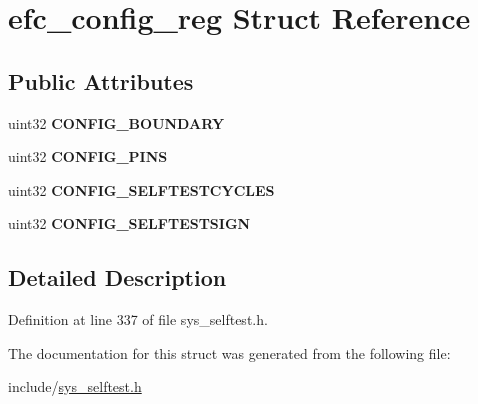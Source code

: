 \hypertarget{structefc__config__reg}{}\section{efc\+\_\+config\+\_\+reg Struct Reference}
\label{structefc__config__reg}
\subsection*{Public Attributes}
\begin{DoxyCompactItemize}
\item 
\mbox{\label{structefc__config__reg_af047cc1abe2ff223ba3ebf0304d72f48}} 
uint32 {\bfseries C\+O\+N\+F\+I\+G\+\_\+\+B\+O\+U\+N\+D\+A\+RY}
\item 
\mbox{\label{structefc__config__reg_ac5abca109dca8b8f3df2655387a70e90}} 
uint32 {\bfseries C\+O\+N\+F\+I\+G\+\_\+\+P\+I\+NS}
\item 
\mbox{\label{structefc__config__reg_ae785b7f82da800986ae664e618522b56}} 
uint32 {\bfseries C\+O\+N\+F\+I\+G\+\_\+\+S\+E\+L\+F\+T\+E\+S\+T\+C\+Y\+C\+L\+ES}
\item 
\mbox{\label{structefc__config__reg_af38ea96963791fca2ecef6d58562683d}} 
uint32 {\bfseries C\+O\+N\+F\+I\+G\+\_\+\+S\+E\+L\+F\+T\+E\+S\+T\+S\+I\+GN}
\end{DoxyCompactItemize}


\subsection{Detailed Description}


Definition at line 337 of file sys\+\_\+selftest.\+h.



The documentation for this struct was generated from the following file\+:\begin{DoxyCompactItemize}
\item 
include/\mbox{\hyperlink{sys__selftest_8h}{sys\+\_\+selftest.\+h}}\end{DoxyCompactItemize}
